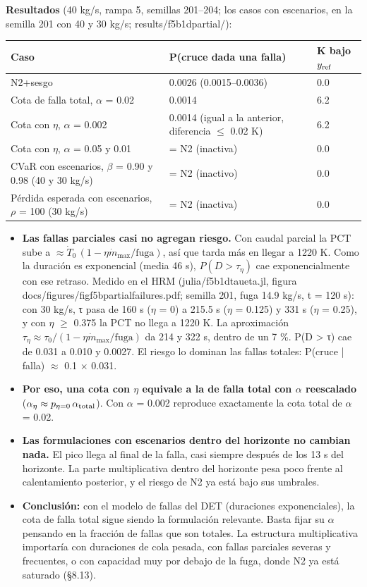 \documentclass[11pt,a4paper]{article}
\newcommand{\codeus}{\textunderscore\allowbreak}
\newcommand{\code}[1]{{\small\ttfamily\let\_\codeus #1}}
\begin{document}
\textbf{Resultados} (40 kg/s, rampa 5, semillas 201–204; los casos con escenarios, en la semilla 201 con 40 y 30 kg/s; \code{results/f5b1d\_partial/}):

{\small
\begin{xltabular}{\linewidth}{@{}YYY@{}}
\toprule
\textbf{Caso} & \textbf{P(cruce dada una falla)} & \textbf{K bajo $y_{\rm ref}$} \\
\midrule
\endhead
N2+sesgo & 0.0026 (0.0015–0.0036) & 0.0 \\
Cota de falla total, $\alpha$ = 0.02 & 0.0014 & 6.2 \\
Cota con $\eta$, $\alpha$ = 0.002 & 0.0014 (igual a la anterior, diferencia $\le$ 0.02 K) & 6.2 \\
Cota con $\eta$, $\alpha$ = 0.05 y 0.01 & = N2 (inactiva) & 0.0 \\
CVaR con escenarios, $\beta$ = 0.90 y 0.98 (40 y 30 kg/s) & = N2 (inactivo) & 0.0 \\
Pérdida esperada con escenarios, $\rho$ = 100 (30 kg/s) & = N2 (inactiva) & 0.0 \\
\bottomrule
\end{xltabular}}

\begin{itemize}
\item \textbf{Las fallas parciales casi no agregan riesgo.} Con caudal parcial la PCT sube a $\approx\dot T_0\,(1-\eta\dot m_{\max}/\text{fuga})$, así que tarda más en llegar a 1220 K. Como la duración es exponencial (media 46 s), $P(D>\tau_\eta)$ cae exponencialmente con ese retraso. Medido en el HRM (\code{julia/f5b1d\_tau\_eta.jl}, figura \code{docs/figures/fig\_f5b\_partial\_failures.pdf}; semilla 201, fuga 14.9 kg/s, t = 120 s): con 30 kg/s, τ pasa de 160 s ($\eta$ = 0) a 215.5 s ($\eta$ = 0.125) y 331 s ($\eta$ = 0.25), y con $\eta$ $\ge$ 0.375 la PCT no llega a 1220 K. La aproximación $\tau_\eta\approx\tau_0/(1-\eta\dot m_{\max}/\text{fuga})$ da 214 y 322 s, dentro de un 7 \%. P(D > τ) cae de 0.031 a 0.010 y 0.0027. El riesgo lo dominan las fallas totales: P(cruce | falla) $\approx$ 0.1 $\times$ 0.031.
\item \textbf{Por eso, una cota con $\eta$ equivale a la de falla total con $\alpha$ reescalado} ($\alpha_\eta\approx p_{\eta=0}\,\alpha_{\rm total}$). Con $\alpha$ = 0.002 reproduce exactamente la cota total de $\alpha$ = 0.02.
\item \textbf{Las formulaciones con escenarios dentro del horizonte no cambian nada.} El pico llega al final de la falla, casi siempre después de los 13 s del horizonte. La parte multiplicativa dentro del horizonte pesa poco frente al calentamiento posterior, y el riesgo de N2 ya está bajo sus umbrales.
\item \textbf{Conclusión:} con el modelo de fallas del DET (duraciones exponenciales), la cota de falla total sigue siendo la formulación relevante. Basta fijar su $\alpha$ pensando en la fracción de fallas que son totales. La estructura multiplicativa importaría con duraciones de cola pesada, con fallas parciales severas y frecuentes, o con capacidad muy por debajo de la fuga, donde N2 ya está saturado (\S{}8.13).
\end{itemize}
\end{document}
